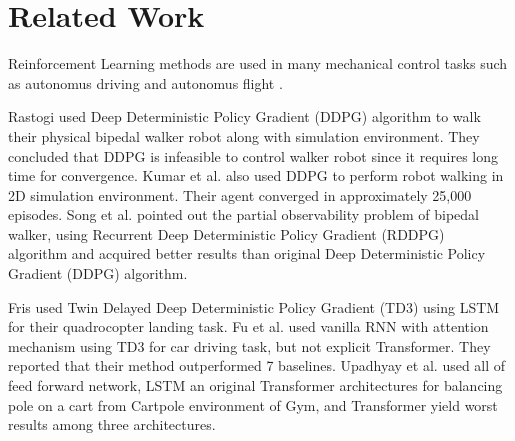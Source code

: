 \section{Related Work}
\label{sec:related_work}

Reinforcement Learning methods are used in many mechanical control tasks 
such as autonomus driving \cite{pan_virtual_2017, shalev-shwartz_safe_2016, sallab_deep_2017, wang_deep_2019} 
and autonomus flight \cite{kopsa_reinforcement_2018, abbeel_application_2006, santos_experimental_2012}.

Rastogi \cite{rastogi_deep_2017} used Deep Deterministic Policy Gradient (DDPG) algorithm to walk 
their physical bipedal walker robot along with simulation environment. 
They concluded that DDPG is infeasible to control walker robot 
since it requires long time for convergence. 
Kumar et al. \cite{kumar_bipedal_2018} also used DDPG to perform 
robot walking in 2D simulation environment. 
Their agent converged in approximately 25,000 episodes. 
Song et al. \cite{song_recurrent_2018} pointed out the partial observability problem of bipedal walker, 
using Recurrent Deep Deterministic Policy Gradient (RDDPG)~\cite{heess_memory-based_2015} algorithm 
and acquired better results than original Deep Deterministic Policy Gradient (DDPG) algorithm. 

Fris \cite{fris_landing_2020} used Twin Delayed Deep Deterministic Policy Gradient (TD3) 
using LSTM for their quadrocopter landing task. 
Fu et al. \cite{fu_when_2020} used vanilla RNN with attention mechanism 
using TD3 for car driving task, but not explicit Transformer. 
They reported that their method outperformed 7 baselines. 
Upadhyay et al. \cite{upadhyay_transformer_2019} used all of feed forward network, 
LSTM an original Transformer architectures for balancing pole 
on a cart from Cartpole environment of Gym, and Transformer yield worst results among three architectures.

